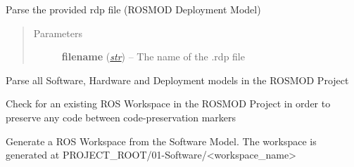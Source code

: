 \documentclass[letterpaper,10pt,english]{sphinxmanual}
\begin{document}
\begin{fulllineitems}
\begin{fulllineitems}
\begin{quote}
\begin{description}
\end{description}\end{quote}

\end{fulllineitems}


\begin{fulllineitems}
\label{class_Project:ROSMOD_Project.parse_rdp}
Parse the provided rdp file (ROSMOD Deployment Model)
\begin{quote}\begin{description}
\item[{Parameters}] \leavevmode
\textbf{filename} (\href{http://docs.python.org/library/functions.html\#str}{\emph{str}}) -- The name of the .rdp file

\end{description}\end{quote}

\end{fulllineitems}


\begin{fulllineitems}
\label{class_Project:ROSMOD_Project.parse_models}
Parse all Software, Hardware and Deployment models in the ROSMOD Project

\end{fulllineitems}


\begin{fulllineitems}
\label{class_Project:ROSMOD_Project.check_workspace}
Check for an existing ROS Workspace in the ROSMOD Project in order to preserve any code between code-preservation markers

\end{fulllineitems}


\begin{fulllineitems}
\label{class_Project:ROSMOD_Project.generate_workspace}
Generate a ROS Workspace from the Software Model. The workspace is generated at PROJECT\_ROOT/01-Software/\textless{}workspace\_name\textgreater{}


\end{fulllineitems}
\end{fulllineitems}
\end{document}
